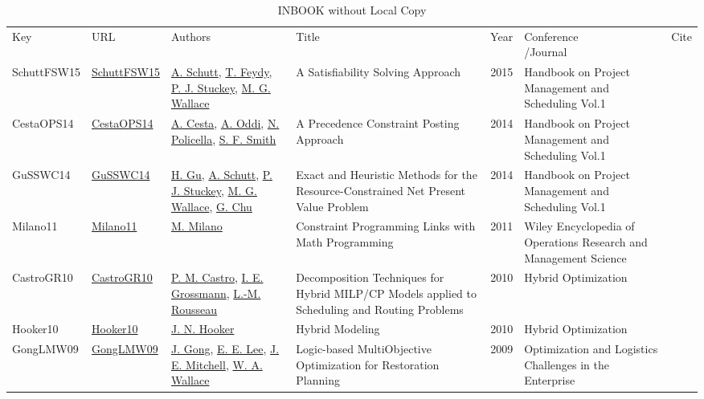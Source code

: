 {\scriptsize
\begin{longtable}{p{2cm}p{2cm}p{5cm}p{10cm}rp{3cm}l}
\rowcolor{white}\caption{INBOOK without Local Copy}\\ \toprule
\rowcolor{white}Key & URL & Authors & Title & Year & \shortstack{Conference\\/Journal} & Cite\\ \midrule
\endhead
\bottomrule
\endfoot
SchuttFSW15 & \href{https://doi.org/10.1007/978-3-319-05443-8_7}{SchuttFSW15} & \hyperref[auth:a124]{A. Schutt}, \hyperref[auth:a154]{T. Feydy}, \hyperref[auth:a125]{P. J. Stuckey}, \hyperref[auth:a117]{M. G. Wallace} & A Satisfiability Solving Approach & 2015 & Handbook on Project Management and Scheduling Vol.1 & \cite{SchuttFSW15}\\
CestaOPS14 & \href{http://dx.doi.org/10.1007/978-3-319-05443-8_6}{CestaOPS14} & \hyperref[auth:a284]{A. Cesta}, \hyperref[auth:a282]{A. Oddi}, \hyperref[auth:a283]{N. Policella}, \hyperref[auth:a298]{S. F. Smith} & A Precedence Constraint Posting Approach & 2014 & Handbook on Project Management and Scheduling Vol.1 & \cite{CestaOPS14}\\
GuSSWC14 & \href{http://dx.doi.org/10.1007/978-3-319-05443-8_14}{GuSSWC14} & \hyperref[auth:a336]{H. Gu}, \hyperref[auth:a124]{A. Schutt}, \hyperref[auth:a125]{P. J. Stuckey}, \hyperref[auth:a117]{M. G. Wallace}, \hyperref[auth:a343]{G. Chu} & Exact and Heuristic Methods for the Resource-Constrained Net Present Value Problem & 2014 & Handbook on Project Management and Scheduling Vol.1 & \cite{GuSSWC14}\\
Milano11 & \href{http://dx.doi.org/10.1002/9780470400531.eorms0473}{Milano11} & \hyperref[auth:a143]{M. Milano} & Constraint Programming Links with Math Programming & 2011 & Wiley Encyclopedia of Operations Research and Management Science & \cite{Milano11}\\
CastroGR10 & \href{http://dx.doi.org/10.1007/978-1-4419-1644-0_4}{CastroGR10} & \hyperref[auth:a891]{P. M. Castro}, \hyperref[auth:a382]{I. E. Grossmann}, \hyperref[auth:a326]{L.-M. Rousseau} & Decomposition Techniques for Hybrid MILP/CP Models applied to Scheduling and Routing Problems & 2010 & Hybrid Optimization & \cite{CastroGR10}\\
Hooker10 & \href{http://dx.doi.org/10.1007/978-1-4419-1644-0_2}{Hooker10} & \hyperref[auth:a160]{J. N. Hooker} & Hybrid Modeling & 2010 & Hybrid Optimization & \cite{Hooker10}\\
GongLMW09 & \href{http://dx.doi.org/10.1007/978-0-387-88617-6_11}{GongLMW09} & \hyperref[auth:a1234]{J. Gong}, \hyperref[auth:a1235]{E. E. Lee}, \hyperref[auth:a1236]{J. E. Mitchell}, \hyperref[auth:a1237]{W. A. Wallace} & Logic-based MultiObjective Optimization for Restoration Planning & 2009 & Optimization and Logistics Challenges in the Enterprise & \cite{GongLMW09}\\

\end{longtable}}
